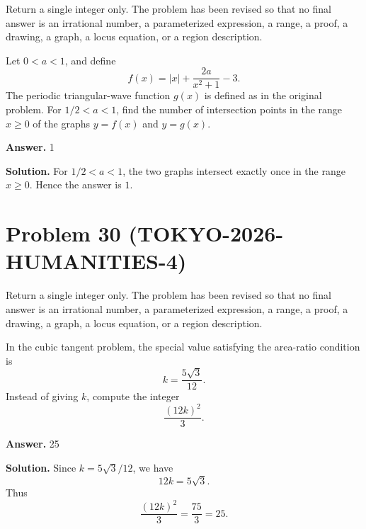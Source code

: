 \documentclass[11pt]{article}
\begin{document}
Return a single integer only. The problem has been revised so that no final answer is an irrational number, a parameterized expression, a range, a proof, a drawing, a graph, a locus equation, or a region description.

Let \(0<a<1\), and define
\[
f(x)=|x|+\frac{2a}{x^2+1}-3.
\]
The periodic triangular-wave function \(g(x)\) is defined as in the original
problem. For \(1/2<a<1\), find the number of intersection points in the range
\(x\ge0\) of the graphs \(y=f(x)\) and \(y=g(x)\).


\textbf{Answer.} 1


\textbf{Solution.}
For \(1/2<a<1\), the two graphs intersect exactly once in the range
\(x\ge0\). Hence the answer is \(1\).


\section*{Problem 30 (TOKYO-2026-HUMANITIES-4)}

Return a single integer only. The problem has been revised so that no final answer is an irrational number, a parameterized expression, a range, a proof, a drawing, a graph, a locus equation, or a region description.

In the cubic tangent problem, the special value satisfying the area-ratio
condition is
\[
k=\frac{5\sqrt3}{12}.
\]
Instead of giving \(k\), compute the integer
\[
\frac{(12k)^2}{3}.
\]


\textbf{Answer.} 25


\textbf{Solution.}
Since \(k=5\sqrt3/12\), we have
\[
12k=5\sqrt3.
\]
Thus
\[
\frac{(12k)^2}{3}=\frac{75}{3}=25.
\]
\end{document}
